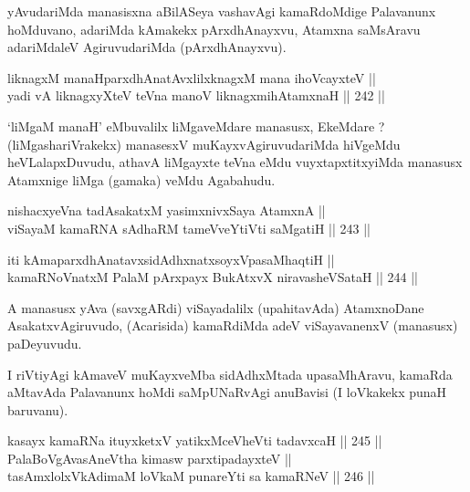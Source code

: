 \begin{artha}
yAvudariMda manasisxna aBilASeya vashavAgi kamaRdoMdige
Palavanunx hoMduvano, adariMda kAmakekx pArxdhAnayxvu, Atamxna
saMsAravu adariMdaleV AgiruvudariMda (pArxdhAnayxvu).
\end{artha}


\begin{shl}
liknagxM manaHparxdhAnatAvxlilxknagxM mana ihoVcayxteV || \\
yadi vA liknagxyXteV teVna manoV liknagxmihA\s \s tamxnaH ||  242 ||  
\end{shl}

\begin{artha}
`liMgaM manaH' eMbuvalilx liMgaveMdare manasusx, EkeMdare ?
(liMgashariVrakekx) manasesxV muKayxvAgiruvudariMda hiVgeMdu
heVLalapxDuvudu, athavA liMgayxte teVna eMdu vuyxtapxtitxyiMda
manasusx Atamxnige liMga (gamaka) veMdu Agabahudu.
\end{artha}

\begin{shl}
nishacxyeVna tadAsakatxM yasimxnivxSaya AtamxnA || \\
viSayaM kamaRNA sAdhaRM tameVveYtiVti saMgatiH ||  243 ||  
\end{shl}

\begin{shl}
iti kAmaparxdhAnatavxsidAdhxnatxsoyxVpasaMhaqtiH || \\
kamaRNoV\s natxM PalaM pArxpayx BukAtxvX niravasheVSataH ||  244 ||  
\end{shl}

\begin{artha}
A manasusx yAva (savxgARdi) viSayadalilx (upahitavAda) AtamxnoDane
AsakatxvAgiruvudo, (Acarisida) kamaRdiMda adeV viSayavanenxV (manasusx)
paDeyuvudu.
\end{artha}


\begin{artha}
I riVtiyAgi kAmaveV muKayxveMba sidAdhxMtada upasaMhAravu, kamaRda
aMtavAda Palavanunx hoMdi saMpUNaRvAgi anuBavisi (I loVkakekx punaH
baruvanu).
\end{artha}


\begin{shl}
kasayx kamaRNa ituyxketxV yatikxMceVheVti tadavxcaH ||  245 ||  \\
PalaBoVgAvasAneV\s tha kimasw parxtipadayxteV || \\
tasAmxlolxVkAdimaM loVkaM punareYti sa kamaRNeV ||  246 ||  
\end{shl}

